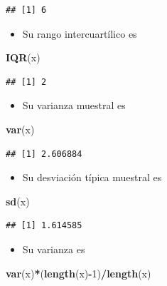\documentclass[]{book}
\newenvironment{Shaded}{\begin{snugshade}}{\end{snugshade}}
\newcommand{\DecValTok}[1]{\textcolor[rgb]{0.00,0.00,0.81}{#1}}
\newcommand{\KeywordTok}[1]{\textcolor[rgb]{0.13,0.29,0.53}{\textbf{#1}}}
\newcommand{\NormalTok}[1]{#1}
\newcommand{\OperatorTok}[1]{\textcolor[rgb]{0.81,0.36,0.00}{\textbf{#1}}}
\providecommand{\tightlist}{%
  \setlength{\itemsep}{0pt}\setlength{\parskip}{0pt}}
\theoremstyle{definition}
\theoremstyle{definition}
\theoremstyle{definition}
\theoremstyle{remark}
\begin{document}
\begin{verbatim}
## [1] 6
\end{verbatim}

\begin{itemize}
\tightlist
\item
  Su rango intercuartílico es
\end{itemize}

\begin{Shaded}
\begin{Highlighting}[]
\KeywordTok{IQR}\NormalTok{(x)   }
\end{Highlighting}
\end{Shaded}

\begin{verbatim}
## [1] 2
\end{verbatim}

\begin{itemize}
\tightlist
\item
  Su varianza muestral es
\end{itemize}

\begin{Shaded}
\begin{Highlighting}[]
\KeywordTok{var}\NormalTok{(x) }
\end{Highlighting}
\end{Shaded}

\begin{verbatim}
## [1] 2.606884
\end{verbatim}

\begin{itemize}
\tightlist
\item
  Su desviación típica muestral es
\end{itemize}

\begin{Shaded}
\begin{Highlighting}[]
\KeywordTok{sd}\NormalTok{(x) }
\end{Highlighting}
\end{Shaded}

\begin{verbatim}
## [1] 1.614585
\end{verbatim}

\begin{itemize}
\tightlist
\item
  Su varianza es
\end{itemize}

\begin{Shaded}
\begin{Highlighting}[]
\KeywordTok{var}\NormalTok{(x)}\OperatorTok{*}\NormalTok{(}\KeywordTok{length}\NormalTok{(x)}\OperatorTok{-}\DecValTok{1}\NormalTok{)}\OperatorTok{/}\KeywordTok{length}\NormalTok{(x)}
\end{Highlighting}
\end{Shaded}
\end{document}
